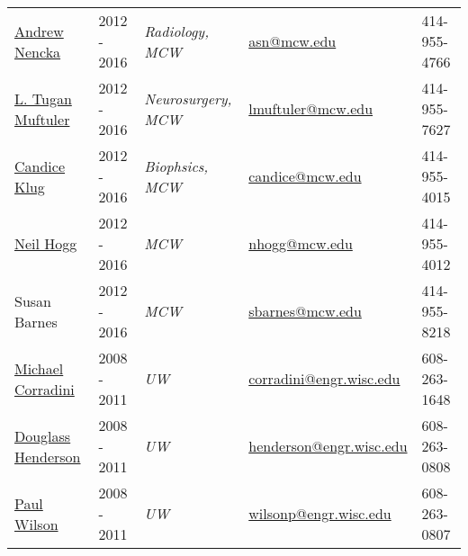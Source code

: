
\begin{center}
\begin{minipage}{\textwidth}
\begin{tabular}{p{3.2cm}p{2.2cm}p{3.3cm}p{5.0cm}p{2.4cm}}
{\href{http://www.mcw.edu/radiology/faculty/Andrew-Nencka-PhD.htm}{Andrew Nencka}}\label{andrew_nencka} & {2012 - 2016}  & {\textit{Radiology, MCW}}& \href{mailto:asn@mcw.edu}{asn@mcw.edu}  &  414-955-4766\\ %

{\href{http://neurosurgery.mcw.edu/faculty/research/muftuler/}{L. Tugan Muftuler}}\label{tugan_muftuler} & {2012 - 2016}  & {\textit{Neurosurgery, MCW}}& \href{mailto:lmuftuler@mcw.edu}{lmuftuler@mcw.edu}  &  414-955-7627\\ %

{\href{http://www.mcw.edu/biophysics/facultyandstaff/CandiceSKlug.htm}{Candice Klug}}\label{candice_klug} & {2012 - 2016}  & {\textit{Biophsics, MCW}}& \href{mailto:candice@mcw.edu}{candice@mcw.edu}  &  414-955-4015\\ %

{\href{http://www.mcw.edu/biophysics/facultyandstaff/NeilHogg.htm}{Neil Hogg}}\label{neil_hogg} & {2012 - 2016}  & {\textit{MCW}}& \href{mailto:nhogg@mcw.edu}{nhogg@mcw.edu} & 414-955-4012 \\ %

{Susan Barnes}\label{susan_barnes} & {2012 - 2016} & {\textit{MCW}} &  \href{mailto:sbarnes@mcw.edu}{sbarnes@mcw.edu} &   414-955-8218 \\ %

{\href{https://directory.engr.wisc.edu/ep/faculty/corradini\_michael}{Michael Corradini}}\label{michael_corradini}&{2008 - 2011} & {\textit{UW}}  &\href{mailto:corradini@engr.wisc.edu}{corradini@engr.wisc.edu} &  608-263-1648 \\ %

{\href{https://directory.engr.wisc.edu/ep/faculty/henderson\_douglass}{Douglass Henderson}}\label{douglass_henderson}& {2008 - 2011}  & {\textit{UW}}& \href{mailto:henderson@engr.wisc.edu}{henderson@engr.wisc.edu} &  608-263-0808 \\ %
  
{\href{https://directory.engr.wisc.edu/ep/faculty/wilson\_paul}{Paul Wilson}}\label{paul_wilson} & {2008 - 2011}  & {\textit{UW}}& \href{mailto:wilsonp@engr.wisc.edu}{wilsonp@engr.wisc.edu} &  608-263-0807 \\ %

\end{tabular}
\end{minipage}
\end{center}

